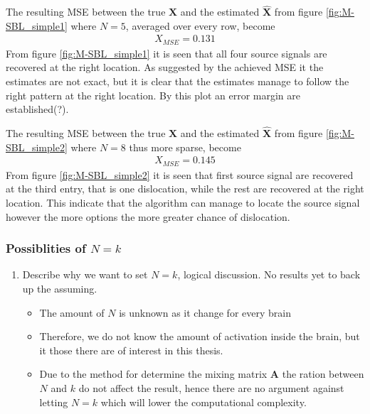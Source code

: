 The resulting MSE between the true $\textbf{X}$ and the estimated $\hat{\textbf{X}}$ from figure \ref{fig:M-SBL_simple1} where $N = 5$, averaged over every row, become 
\begin{align*}
X_{MSE} = 0.131 
\end{align*}
From figure \ref{fig:M-SBL_simple1} it is seen that all four source signals are recovered at the right location. As suggested by the achieved MSE it the estimates are not exact, but it is clear that the estimates manage to follow the right pattern at the right location. By this plot an error margin are established(?).  

The resulting MSE between the true $\textbf{X}$ and the estimated $\hat{\textbf{X}}$ from figure \ref{fig:M-SBL_simple2} where $N = 8$ thus more sparse, become 
\begin{align*}
X_{MSE} = 0.145 
\end{align*}
From figure \ref{fig:M-SBL_simple2} it is seen that first source signal are recovered at the third entry, that is one dislocation, while the rest are recovered at the right location. This indicate that the algorithm can manage to locate the source signal however the more options the more greater chance of dislocation.     

\subsubsection*{Possiblities of $N=k$}
\begin{enumerate}
\item Describe why we want to set $N = k$, logical discussion. No results yet to back up the assuming.
	\begin{itemize}
	\item The amount of $N$ is unknown as it change for every brain
	\item Therefore, we do not know the amount of activation inside the brain, but it those there are of interest in this thesis.
	\item Due to the method for determine the mixing matrix $\textbf{A}$ the ration between $N$ and $k$ do not affect the result, hence there are no argument against letting $N=k$ which will lower the computational complexity.    
	\end{itemize}
\end{enumerate}

